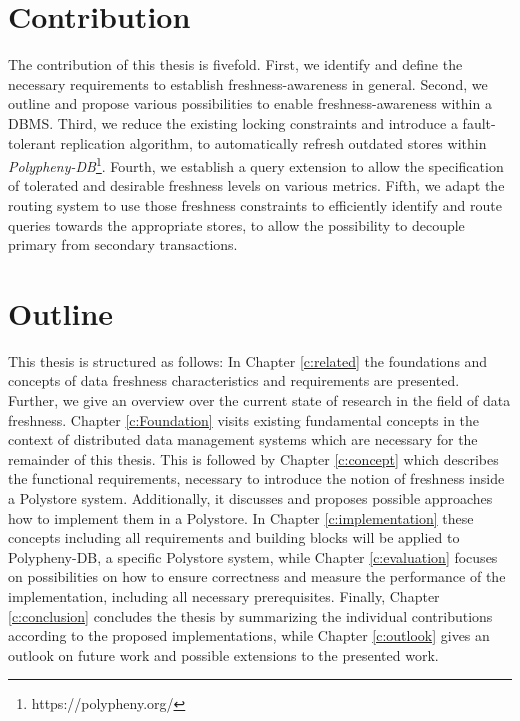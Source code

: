 
\section{Contribution}
The contribution of this thesis is fivefold. First, we identify and define the necessary requirements to establish freshness-awareness in general.
Second, we outline and propose various possibilities to enable freshness-awareness within a DBMS. Third, we reduce the existing locking constraints and 
introduce a fault-tolerant replication algorithm, to automatically refresh outdated stores within \emph{Polypheny-DB}\footnote{https://polypheny.org/}. 
Fourth, we establish a query extension to allow the specification of tolerated and desirable freshness levels 
on various metrics. Fifth, we adapt the routing system to use those freshness constraints to efficiently identify and route queries towards the appropriate stores, 
to allow the possibility to decouple primary from secondary transactions.




\section{Outline}
This thesis is structured as follows:
In Chapter \ref{c:related} the foundations and concepts of data freshness characteristics and requirements are presented.
Further, we give an overview over the current state of research in the field of data freshness. 
Chapter \ref{c:Foundation} visits existing fundamental concepts in the context of distributed data management systems 
which are necessary for the remainder of this thesis. 
This is followed by Chapter \ref{c:concept} which describes the functional requirements, necessary to introduce the notion of freshness inside a Polystore system. 
Additionally, it discusses and proposes possible approaches how to implement them in a Polystore. 
In Chapter \ref{c:implementation} these concepts including all requirements and building blocks will be applied to Polypheny-DB, a specific Polystore system,
while Chapter \ref{c:evaluation} focuses on possibilities on how to ensure correctness and measure the performance of the implementation, including all necessary prerequisites.
Finally, Chapter \ref{c:conclusion} concludes the thesis by summarizing the individual contributions according to the proposed
implementations, while Chapter \ref{c:outlook} gives an outlook on future work and possible extensions to the presented work.


